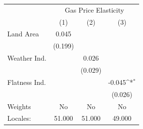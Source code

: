 {
\def\sym#1{\ifmmode^{#1}\else\(^{#1}\)\fi}
\begin{tabular}{l*{3}{c}}
\hline\hline
            &\multicolumn{3}{c}{Gas Price Elasticity}                         \\
            &\multicolumn{1}{c}{(1)}         &\multicolumn{1}{c}{(2)}         &\multicolumn{1}{c}{(3)}         \\
\hline
Land Area   &       0.045         &                     &                     \\
            &     (0.199)         &                     &                     \\
[1em]
Weather Ind.&                     &       0.026         &                     \\
            &                     &     (0.029)         &                     \\
[1em]
Flatness Ind.&                     &                     &      -0.045\sym{*}  \\
            &                     &                     &     (0.026)         \\
\hline
Weights     &          No         &          No         &          No         \\
Locales:    &      51.000         &      51.000         &      49.000         \\
\hline\hline
\end{tabular}
}
